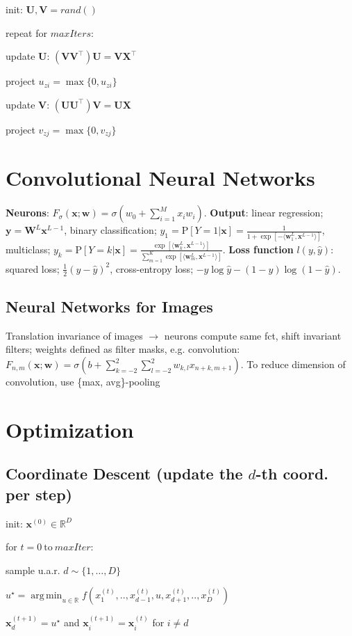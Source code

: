 \documentclass[a4paper, 11pt, landscape]{article}
\DeclareMathOperator*{\argmin}{arg\,min}
\begin{document}
\begin{multicols*}{3}
\begin{inparaenum}
	\item init: $\mathbf{U}, \mathbf{V} = rand()$
	\item repeat for $\mathit{maxIters}$:
	\item update $\mathbf{U}$: $(\mathbf{VV}^\top)\mathbf{U} = \mathbf{VX}^\top$
	\item project $u_{zi} = \max \{ 0, u_{zi} \}$
	\item update $\mathbf{V}$: $(\mathbf{UU}^\top)\mathbf{V} = \mathbf{UX}$
	\item project $v_{zj} = \max \{ 0, v_{zj} \}$
\end{inparaenum}

\section{Convolutional Neural Networks}
\textbf{Neurons}: $F_\sigma(\mathbf{x};\mathbf{w}) = \sigma(w_0 + \sum_{i=1}^M{x_iw_i})$. \textbf{Output}: linear regression; $\mathbf{y} = \mathbf{W}^L\mathbf{x}^{L-1}$, binary classification; $y_1 = \text{P}[Y=1|\mathbf{x}] = \frac{1}{1 + \exp[-\langle \mathbf{w}_1^L,\mathbf{x}^{L-1}\rangle]}$, multiclass; $y_k = \text{P}[Y=k|\mathbf{x}]= \frac{\exp[\langle \mathbf{w}_k^L,\mathbf{x}^{L-1}\rangle]}{\sum_{m=1}^{K}{\exp[\langle \mathbf{w}_m^L, \mathbf{x}^{L-1}\rangle]}}$. \textbf{Loss function} $l(y, \hat{y})$: squared loss; $\frac{1}{2}(y - \hat{y})^2$, cross-entropy loss; $-y \log \hat{y} - (1-y)\log(1-\hat{y})$.

\subsection{Neural Networks for Images}
Translation invariance of images $\rightarrow$ neurons compute same fct, shift invariant filters; weights defined as filter masks, e.g. convolution: $F_{n,m}(\mathbf{x};\mathbf{w}) = \sigma(b + \sum_{k=-2}^2\sum_{l=-2}^{2}{w_{k,l}x_{n+k,m+1}})$. To reduce dimension of convolution, use \{max, avg\}-pooling 

\section{Optimization}

\subsection{Coordinate Descent (update the $d$-th coord. per step)}
\begin{inparaenum}
	\item init: $\mathbf{x}^{(0)} \in \mathbb{R}^D$
	\item for $t = 0 \ \text{to} \ \mathit{maxIter}$:
	\item sample u.a.r. $d \sim \{1, \ldots, D\}$
	\item $u^\star = \argmin_{u \in \mathbb{R}} f(x_1^{(t)}, .., x_{d-1}^{(t)}, u, x_{d+1}^{(t)}, .., x_D^{(t)})$
	\item $\mathbf{x}_d^{(t+1)} = u^\star$ and $\mathbf{x}_i^{(t+1)} = \mathbf{x}_i^{(t)}$ for $i \neq d$
\end{inparaenum}


\end{multicols*}
\end{document}

